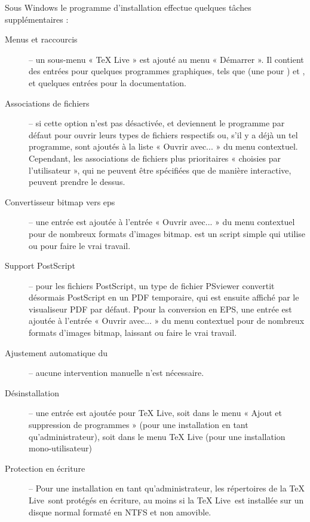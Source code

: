 \documentclass[german, english, french]{article}
\renewcommand{\TL}{\TeX{} Live\xspace}%
\begin{document}
Sous Windows le programme d'installation effectue quelques tâches
supplémentaires :
\begin{description}
\item[Menus et raccourcis] -- un sous-menu « \TL{} » est ajouté au menu
  « Démarrer ». Il contient des entrées pour quelques programmes graphiques,
  tels que  (une \GUI{} pour ) et , et
  quelques entrées pour la documentation.

\item[Associations de fichiers] -- si cette option n'est pas désactivée,
   et  deviennent le programme par défaut pour
  ouvrir leurs types de fichiers respectifs ou, s'il y a déjà un tel programme,
  sont ajoutés à la liste « Ouvrir avec... » du menu contextuel. Cependant, les
  associations de fichiers plus prioritaires « choisies par l'utilisateur », qui
  ne peuvent être spécifiées que de manière interactive, peuvent prendre le
  dessus.

\item[Convertisseur bitmap vers eps] -- une entrée  est
  ajoutée à l'entrée « Ouvrir avec... » du menu contextuel pour de nombreux
  formats d'images bitmap.  est un script simple qui utilise
   ou  pour faire le vrai travail.

\item[Support PostScript] -- pour les fichiers PostScript, un type de fichier
  PSviewer convertit désormais PostScript en un PDF temporaire, qui est ensuite
  affiché par le visualiseur PDF par défaut. Ppour la conversion en EPS, une
  entrée  est ajoutée à l'entrée « Ouvrir avec... » du menu
  contextuel pour de nombreux formats d'images bitmap, laissant
   ou  faire le vrai travail.

\item[Ajustement automatique du ] -- aucune intervention manuelle
  n'est nécessaire.

\item[Désinstallation] -- une entrée est ajoutée pour \TL{}, soit dans le menu
  « Ajout et suppression de programmes » (pour une installation en tant
  qu'administrateur), soit dans le menu \TL{} (pour une installation
  mono-utilisateur)

\item[Protection en écriture] -- Pour une installation en tant
  qu'administrateur, les répertoires de la \TL\ sont protégés en écriture, au
  moins si la \TL\ est installée sur un disque normal formaté en NTFS et non
  amovible.
\end{description}
\end{document}
